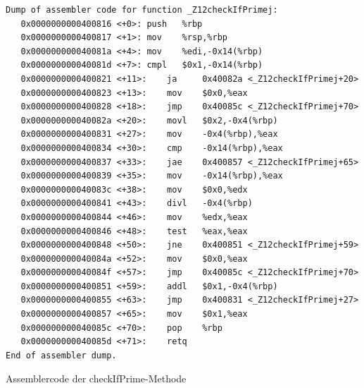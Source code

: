 \documentclass[a4paper,12pt]{article}
\begin{document}
\begin{code}[!htb]
\begin{lstlisting}
Dump of assembler code for function _Z12checkIfPrimej:
   0x0000000000400816 <+0>:	push   %rbp
   0x0000000000400817 <+1>:	mov    %rsp,%rbp
   0x000000000040081a <+4>:	mov    %edi,-0x14(%rbp)
   0x000000000040081d <+7>:	cmpl   $0x1,-0x14(%rbp)
   0x0000000000400821 <+11>:	ja     0x40082a <_Z12checkIfPrimej+20>
   0x0000000000400823 <+13>:	mov    $0x0,%eax
   0x0000000000400828 <+18>:	jmp    0x40085c <_Z12checkIfPrimej+70>
   0x000000000040082a <+20>:	movl   $0x2,-0x4(%rbp)
   0x0000000000400831 <+27>:	mov    -0x4(%rbp),%eax
   0x0000000000400834 <+30>:	cmp    -0x14(%rbp),%eax
   0x0000000000400837 <+33>:	jae    0x400857 <_Z12checkIfPrimej+65>
   0x0000000000400839 <+35>:	mov    -0x14(%rbp),%eax
   0x000000000040083c <+38>:	mov    $0x0,%edx
   0x0000000000400841 <+43>:	divl   -0x4(%rbp)
   0x0000000000400844 <+46>:	mov    %edx,%eax
   0x0000000000400846 <+48>:	test   %eax,%eax
   0x0000000000400848 <+50>:	jne    0x400851 <_Z12checkIfPrimej+59>
   0x000000000040084a <+52>:	mov    $0x0,%eax
   0x000000000040084f <+57>:	jmp    0x40085c <_Z12checkIfPrimej+70>
   0x0000000000400851 <+59>:	addl   $0x1,-0x4(%rbp)
   0x0000000000400855 <+63>:	jmp    0x400831 <_Z12checkIfPrimej+27>
   0x0000000000400857 <+65>:	mov    $0x1,%eax
   0x000000000040085c <+70>:	pop    %rbp
   0x000000000040085d <+71>:	retq   
End of assembler dump.

\end{lstlisting}
\caption[Assemblercode der checkIfPrime Methode]{Assemblercode der checkIfPrime-Methode}
\end{code}
\end{document}
